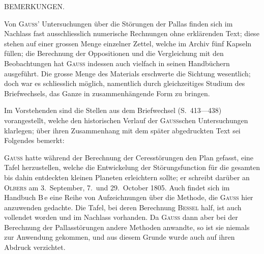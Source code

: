 \clearpage
\begingroup
{}
\renewcommand{\headrulewidth}{0pt}
\begin{center}\large BEMERKUNGEN.\end{center}
\begingroup
\newcommand{\BIntroJ}{\text{\mdseries\AstroSymbols ♃}}
\newcommand{\BIntroP}{\text{\mdseries\AstroSymbols ⚴}}

\par\noindent\hspace*{\parindent}Von \textsc{Gauss}’ Untersuchungen über die Störungen der Pallas finden sich im Nachlass fast ausschliesslich
numerische Rechnungen ohne erklärenden Text; diese stehen auf einer grossen Menge einzelner Zettel,
welche im Archiv fünf Kapseln füllen; die Berechnung der Oppositionen und die Vergleichung mit den
Beobachtungen hat \textsc{Gauss} indessen auch vielfach in seinen Handbüchern ausgeführt. Die grosse Menge des
Materials erschwerte die Sichtung wesentlich; doch war es schliesslich möglich, namentlich durch gleichzeitiges
Studium des Briefwechsels, das Ganze in zusammenhängende Form zu bringen.

\par\noindent\hspace*{\parindent}Im Vorstehenden sind die Stellen aus dem Briefwechsel (S.~413—438) vorangestellt, welche den
historischen Verlauf der \textsc{Gauss}schen Untersuchungen klarlegen; über ihren Zusammenhang mit dem später
abgedruckten Text sei Folgendes bemerkt:

\medskip
\par\noindent\hspace*{\parindent}\textsc{Gauss} hatte während der Berechnung der Ceresstörungen den Plan gefasst, eine Tafel herzustellen,
welche die Entwickelung der Störungsfunction für die gesamten bis dahin entdeckten kleinen Planeten
erleichtern sollte; er schreibt darüber an \textsc{Olbers} am 3.~September, 7.~und 29.~October 1805. Auch findet
sich im Handbuch B\,e eine Reihe von Aufzeichnungen über die Methode, die \textsc{Gauss} hier anzuwenden gedachte.
Die Tafel, bei deren Berechnung \textsc{Bessel} half, ist auch vollendet worden und im Nachlass vorhanden.
Da \textsc{Gauss} dann aber bei der Berechnung der Pallasstörungen andere Methoden anwandte, so ist
sie niemals zur Anwendung gekommen, und aus diesem Grunde wurde auch auf ihren Abdruck verzichtet.

